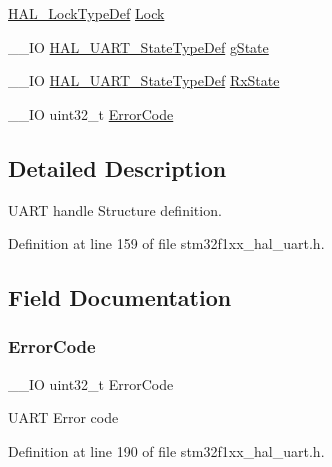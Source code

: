 \begin{DoxyCompactItemize}
\item 
\hyperlink{stm32f1xx__hal__def_8h_ab367482e943333a1299294eadaad284b}{H\+A\+L\+\_\+\+Lock\+Type\+Def} \hyperlink{struct_u_a_r_t___handle_type_def_ad4cf225029dbefe8d3fe660c33b8bb6b}{Lock}
\item 
\+\_\+\+\_\+\+IO \hyperlink{group___u_a_r_t___exported___types_gaf55d844a35379c204c90be5d1e8e50ba}{H\+A\+L\+\_\+\+U\+A\+R\+T\+\_\+\+State\+Type\+Def} \hyperlink{struct_u_a_r_t___handle_type_def_ab596705b6ce037e8debc149ccee148da}{g\+State}
\item 
\+\_\+\+\_\+\+IO \hyperlink{group___u_a_r_t___exported___types_gaf55d844a35379c204c90be5d1e8e50ba}{H\+A\+L\+\_\+\+U\+A\+R\+T\+\_\+\+State\+Type\+Def} \hyperlink{struct_u_a_r_t___handle_type_def_a198c30da19a1529e1665bec6dc455815}{Rx\+State}
\item 
\+\_\+\+\_\+\+IO uint32\+\_\+t \hyperlink{struct_u_a_r_t___handle_type_def_a123c5063e6a3b1901b2fbe5f88c53a7e}{Error\+Code}
\end{DoxyCompactItemize}


\subsection{Detailed Description}
U\+A\+RT handle Structure definition. 

Definition at line 159 of file stm32f1xx\+\_\+hal\+\_\+uart.\+h.



\subsection{Field Documentation}
\mbox{\label{struct_u_a_r_t___handle_type_def_a123c5063e6a3b1901b2fbe5f88c53a7e}} 
\subsubsection{\texorpdfstring{Error\+Code}{ErrorCode}}
{\footnotesize\ttfamily \+\_\+\+\_\+\+IO uint32\+\_\+t Error\+Code}

U\+A\+RT Error code 

Definition at line 190 of file stm32f1xx\+\_\+hal\+\_\+uart.\+h.

\mbox{\label{struct_u_a_r_t___handle_type_def_ab596705b6ce037e8debc149ccee148da}} 
